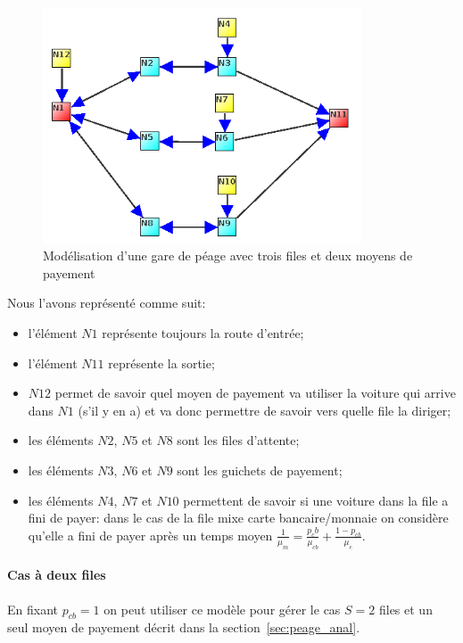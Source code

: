 \documentclass{scrartcl}
\begin{document}
      \begin{figure}[htbp]
        \centering
        \includegraphics[height=7cm]{img/3_files.png}
        \caption{Modélisation d'une gare de péage avec trois files et deux
          moyens de payement}
        \label{figure:syphilis_3_2}
      \end{figure}

      Nous l'avons représenté comme suit:
      \begin{itemize}
        \item l'élément $N1$ représente toujours la route d'entrée;
        \item l'élément $N11$ représente la sortie;
        \item $N12$ permet de savoir quel moyen de payement va utiliser la
          voiture qui arrive dans $N1$ (s'il y en a) et va donc permettre de
          savoir vers quelle file la diriger;
        \item les éléments $N2$, $N5$ et $N8$ sont les files d'attente;
        \item les éléments $N3$, $N6$ et $N9$ sont les guichets de payement;
        \item les éléments $N4$, $N7$ et $N10$ permettent de savoir si une
          voiture dans la file a fini de payer: dans le cas de la file mixe
          carte bancaire/monnaie on considère qu'elle a fini de payer après un
          temps moyen $\frac 1 {\mu_m} = \frac{p_cb}{\mu_{cb}} +
          \frac{1-p_{cb}}{\mu_e}$.
      \end{itemize}

      \paragraph{Cas à deux files}
        En fixant $p_{cb} = 1$ on peut utiliser ce modèle pour gérer le cas
        $S=2$ files et un seul moyen de payement décrit dans la
        section~\ref{sec:peage_anal}.
\end{document}
